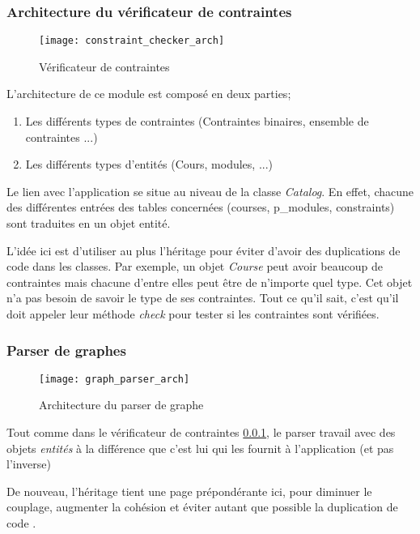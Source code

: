 \subsubsection{Architecture du vérificateur de contraintes}
\label{constraint_checker}
\begin{figure}[H]
\centering
\caption{Vérificateur de contraintes}
\label{fig:constraint_checker_arch}
\texttt{[image: constraint\_checker\_arch]}
\end{figure}

L'architecture de ce module est composé en deux parties;
\begin{enumerate}
  \item Les différents types de contraintes (Contraintes binaires, ensemble de contraintes ...)
  \item Les différents types d'entités (Cours, modules, ...)
\end{enumerate}

Le lien avec l'application se situe au niveau de la classe \textit{Catalog}. En effet, chacune des différentes entrées des tables concernées (courses, p\_modules, constraints) sont traduites en un objet entité.

L'idée ici est d'utiliser au plus l'héritage pour éviter d'avoir des duplications de code dans les classes. Par exemple, un objet \textit{Course} peut avoir beaucoup de contraintes mais chacune d’entre elles peut être de n'importe quel type. Cet objet n'a pas besoin de savoir le type de ses contraintes. Tout ce qu'il sait, c'est qu'il doit appeler leur méthode \textit{check} pour tester si les contraintes sont vérifiées. 


\subsubsection{Parser de graphes}

\begin{figure}[H]
\centering
\caption{Architecture du parser de graphe}
\label{fig:graph_parser_arch}
\texttt{[image: graph\_parser\_arch]}
\end{figure}

Tout comme dans le vérificateur de contraintes \ref{constraint_checker}, le parser travail avec des objets \textit{entités} à la différence que c'est lui qui les fournit à l'application (et pas l'inverse)

De nouveau, l'héritage tient une page prépondérante ici, pour diminuer le couplage, augmenter la cohésion  et éviter autant que possible la duplication de code \cite{cohesion_couplage}. 

